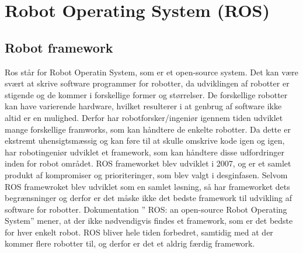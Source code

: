 \chapter{Robot Operating System (ROS)}\label{chap:ROS}
\section{Robot framework}
Ros står for Robot Operatin System, som er et open-source system. Det kan være svært at skrive software programmer for robotter, da udviklingen af robotter er stigende og de kommer i forskellige former og størrelser. De forskellige robotter kan have varierende hardware, hvilket resulterer i at genbrug af software ikke altid er en mulighed. Derfor har robotforsker/ingeniør igennem tiden udviklet mange forskellige framworks, som kan håndtere de enkelte robotter. Da dette er ekstremt uhensigtsmæssig og kan føre til at skulle omskrive kode igen og igen, har robotingeniør udviklet et framework, som kan håndtere disse udfordringer inden for robot området. ROS frameworket blev udviklet i 2007, og er et samlet produkt af kompromiser og prioriteringer, som blev valgt i desginfasen. Selvom ROS framewroket blev udviklet som en samlet løsning, så har frameworket dets begrænsninger og derfor er det måske ikke det bedste framework til udvikling af software for robotter. Dokumentation ” ROS: an open-source Robot Operating System” mener, at der ikke nødvendigvis findes et framework, som er det bedste for hver enkelt robot. ROS bliver hele tiden forbedret, samtidig med at der kommer flere robotter til, og derfor er det et aldrig færdig framework. \newline
